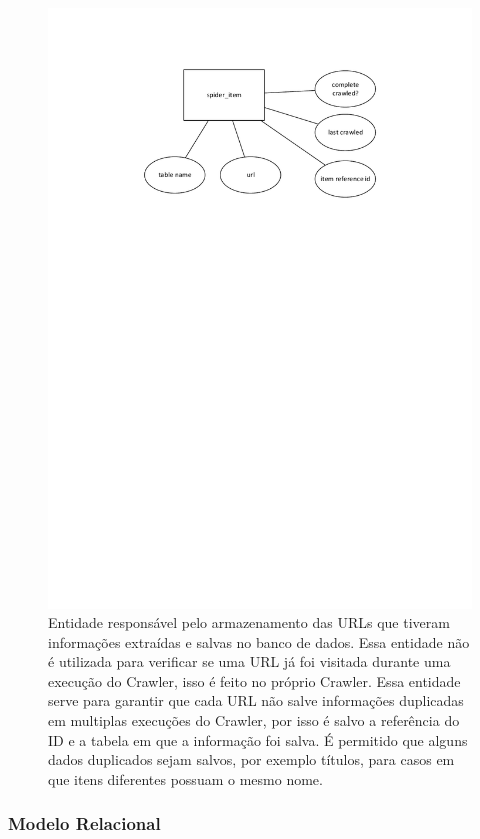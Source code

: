 \documentclass[12pt]{article}
\begin{document}
\begin{figure}[H]
\centering
\includegraphics[width=1\textwidth]{MER_-_Spider_item.pdf}
\caption{Entidade responsável pelo armazenamento das URLs que tiveram informações extraídas e salvas no banco de dados. Essa entidade não é utilizada para verificar se uma URL já foi visitada durante uma execução do Crawler, isso é feito no próprio Crawler. Essa entidade serve para garantir que cada URL não salve informações duplicadas em multiplas execuções do Crawler, por isso é salvo a referência do ID e a tabela em que a informação foi salva. É permitido que alguns dados duplicados sejam salvos, por exemplo títulos, para casos em que itens diferentes possuam o mesmo nome.} \label{hash}
\end{figure}

\subsubsection{Modelo Relacional}
\end{document}
